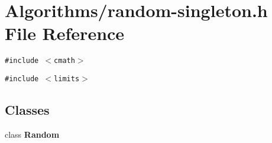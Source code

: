 \section{Algorithms/random-singleton.h File Reference}
\label{random-singleton_8h}
{\tt \#include $<$cmath$>$}\par
{\tt \#include $<$limits$>$}\par
\subsection*{Classes}
\begin{CompactItemize}
\item 
class {\bf Random}
\end{CompactItemize}
